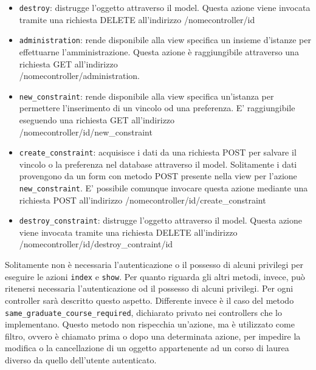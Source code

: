 \documentclass[11pt,a4paper]{article}
\begin{document}
\begin{itemize}
 \item \verb|destroy|: distrugge l'oggetto attraverso il model. Questa azione viene invocata tramite una richiesta DELETE all'indirizzo /nomecontroller/id
 \item \verb|administration|: rende disponibile alla view specifica un insieme d'istanze per effettuarne l'amministrazione. Questa azione è raggiungibile attraverso una richiesta GET all'indirizzo \\ /nomecontroller/administration.
 \item \verb|new_constraint|: rende disponibile alla view specifica un'istanza per permettere l'inserimento di un vincolo od una preferenza. E' raggiungibile eseguendo una richiesta GET all'indirizzo \\ /nomecontroller/id/new\_constraint
 \item \verb|create_constraint|: acquisisce i dati da una richiesta POST per salvare il vincolo o la preferenza nel database attraverso il model. Solitamente i dati provengono da un form con metodo POST presente nella view per l'azione \verb|new_constraint|. E' possibile comunque invocare questa azione mediante una richiesta POST all'indirizzo /nomecontroller/id/create\_constraint
 \item \verb|destroy_constraint|: distrugge l'oggetto attraverso il model. Questa azione viene invocata tramite una richiesta DELETE all'indirizzo /nomecontroller/id/destroy\_contraint/id
\end{itemize}
Solitamente non è necessaria l'autenticazione o il possesso di alcuni privilegi per eseguire le azioni \verb|index| e \verb|show|. Per quanto riguarda gli altri metodi, invece, può ritenersi necessaria l'autenticazione od il possesso di alcuni privilegi. Per ogni controller sarà descritto questo aspetto.
Differente invece è il caso del metodo \verb|same_graduate_course_required|, dichiarato privato nei controllers che lo implementano. Questo metodo non rispecchia un'azione, ma è utilizzato come filtro, ovvero è chiamato prima o dopo una determinata azione, per impedire la modifica o la cancellazione di un oggetto appartenente ad un corso di laurea diverso da quello dell'utente autenticato.
\end{document}

